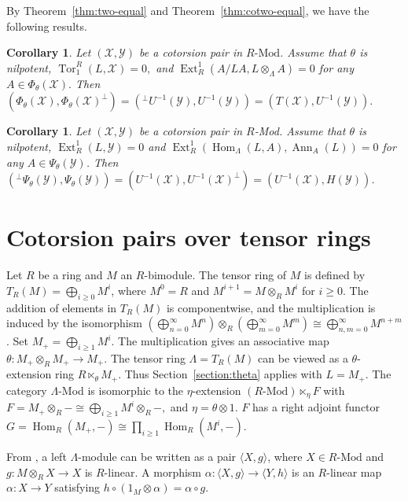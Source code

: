\documentclass[11pt,reqno]{amsart}
\numberwithin{equation}{section}
\newtheorem{corollary}[theorem]{Corollary}
\newcommand{\cX}{\mathcal X}
\newcommand{\cY}{\mathcal Y}
\newcommand{\Ext}{\operatorname{Ext}}
\newcommand{\Hom}{\operatorname{Hom}}
\newcommand{\Tor}{\operatorname{Tor}}
\newcommand{\Mod}{\text{-}\mathrm{Mod}}
\newcommand{\Ann}{\operatorname{Ann}}
\begin{document}
By Theorem~\ref{thm:two-equal} and Theorem~\ref{thm:cotwo-equal}, we have the following results.

\begin{corollary}\label{cor:theta-pair-equality}
Let $(\cX,\cY)$ be a cotorsion pair in $R\text{-Mod}$. Assume that $\theta$ is nilpotent,
$
\Tor_1^R(L,\cX)=0,
$
and
$\Ext_R^1(A/LA,L\otimes_\Lambda A)=0$ for any $A\in\Phi_\theta(\cX).$
Then
$
(\Phi_\theta(\cX),\Phi_\theta(\cX)^\perp)
=({}^\perp U^{-1}(\cY),U^{-1}(\cY))
=(T(\cX),U^{-1}(\cY)).
$
\end{corollary}

\begin{corollary}
Let $(\cX,\cY)$ be a cotorsion pair in $R$-Mod. Assume that $\theta$ is nilpotent, $\Ext^1_R(L, \cY)=0$ and
$\Ext^1_R(\Hom_\Lambda(L, A), \Ann_A(L))=0$ for any $A\in \Psi_\theta(\cY)$. Then
$({}^\perp\Psi_\theta(\cY),\Psi_\theta(\cY))=(U^{-1}(\cX),U^{-1}(\cX)^\perp)=(U^{-1}(\cX),H(\cY))$.
\end{corollary}





\section{Cotorsion pairs over tensor rings}\label{section:tensor}

Let $R$ be a ring and $M$ an $R$-bimodule. The tensor ring of $M$ is defined by $T_R(M)=\bigoplus_{i\ge0}M^i$, where $M^{0}=R$ and $M^{i+1}=M\otimes_R M^{i}$ for $i\geq 0$.
The addition of elements in $T_R(M)$ is componentwise, and the multiplication is induced by the isomorphism
$(\bigoplus_{n=0}^\infty M^n)\otimes_R(\bigoplus_{m=0}^\infty M^m)\cong \bigoplus_{n,m=0}^\infty M^{n+m}$.
Set
$
M_+=\bigoplus_{i\ge1}M^i.
$
The multiplication gives an associative map
$
\theta\colon M_+\otimes_RM_+\longrightarrow M_+.
$
The tensor ring $\Lambda = T_R(M)$ can be viewed as a $\theta$-extension ring
$
R\ltimes_\theta M_+.
$
Thus Section~\ref{section:theta} applies with $L=M_+$. The category $\Lambda$-Mod is isomorphic to the $\eta$-extension $(R\Mod)\ltimes_\eta F$ with $F=M_+\otimes_R-
\cong\bigoplus_{i\ge1}M^i\otimes_R-,$ and $\eta=\theta\otimes 1$. $F$ has a right adjoint functor $G=\Hom_R(M_+,-)
\cong\prod_{i\ge1}\Hom_R(M^i,-).$

From \cite{ChenLu}, a left $\Lambda$-module can be written as a pair $\langle X,g\rangle$, where $X\in R\text{-Mod}$ and
$g\colon M\otimes_RX\longrightarrow X$
is $R$-linear. A morphism
$
\alpha\colon\langle X,g\rangle\longrightarrow\langle Y,h\rangle
$
is an $R$-linear map $\alpha\colon X\to Y$ satisfying
$
h\circ (1_M\otimes\alpha)=\alpha\circ g.
$
\end{document}
